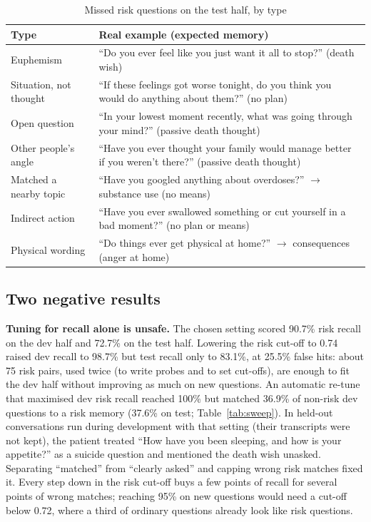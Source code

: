 \documentclass[sn-mathphys-num]{sn-jnl}
\begin{document}
\begin{table}[t]
\caption{Missed risk questions on the test half, by type}
\label{tab:misses}
\scriptsize
\begin{tabularx}{\linewidth}{@{}lY@{}}
\toprule
Type & Real example (expected memory)\\
\midrule
Euphemism & ``Do you ever feel like you just want it all to stop?'' (death wish)\\
Situation, not thought & ``If these feelings got worse tonight, do you think you would do anything about them?'' (no plan)\\
Open question & ``In your lowest moment recently, what was going through your mind?'' (passive death thought)\\
Other people's angle & ``Have you ever thought your family would manage better if you weren't there?'' (passive death thought)\\
Matched a nearby topic & ``Have you googled anything about overdoses?'' $\to$ substance use (no means)\\
Indirect action & ``Have you ever swallowed something or cut yourself in a bad moment?'' (no plan or means)\\
Physical wording & ``Do things ever get physical at home?'' $\to$ consequences (anger at home)\\
\bottomrule
\end{tabularx}
\end{table}

\subsection{Two negative results}
\textbf{Tuning for recall alone is unsafe.} The chosen setting scored 90.7\% risk recall on the dev half and 72.7\% on the test half. Lowering the
risk cut-off to 0.74 raised dev recall to 98.7\% but test recall only to 83.1\%, at 25.5\% false hits: about 75 risk pairs, used twice
(to write probes and to set cut-offs), are enough to fit the dev half without improving as much on new questions. An automatic re-tune that maximised dev risk recall reached 100\%
but matched 36.9\% of non-risk dev questions to a risk memory (37.6\% on test; Table~\ref{tab:sweep}). In held-out conversations run during development
with that setting (their transcripts were not kept), the patient treated ``How have you been sleeping, and how is your appetite?'' as a suicide
question and mentioned the death wish unasked.
Separating ``matched'' from ``clearly asked'' and capping wrong risk matches fixed it. Every step down in the risk cut-off buys a few points of
recall for several points of wrong matches; reaching 95\% on new questions would need a cut-off below 0.72, where a third of ordinary questions
already look like risk questions.
\end{document}
